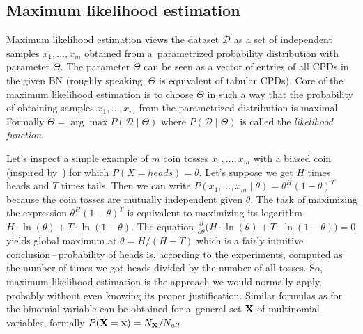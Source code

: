 \documentclass[english,cover]{fitthesis} %
\newcommand{\term}[1]{\emph{#1}}           %
\newcommand{\vars}[1]{{\bold{#1}}}         %
\begin{document}
\subsection{Maximum likelihood estimation}
Maximum likelihood estimation views the dataset $\mathcal{D}$ as a set of independent samples $x_1, \dots, x_m$ obtained from a~parametrized probability distribution with parameter $\Theta$. The parameter $\Theta$ can be seen as a vector of entries of all CPDs in the given BN (roughly speaking, $\Theta$ is  equivalent of tabular CPDs). Core of the maximum likelihood estimation is to choose $\Theta$ in such a way that the probability of obtaining samples $x_1, \dots, x_m$ from the parametrized distribution is maximal. Formally $\Theta = \arg \max P(\mathcal{D} \mid \Theta)$ where $P(\mathcal{D} \mid \Theta)$ is called the \term{likelihood function}.

Let's inspect a simple example of $m$ coin tosses $x_1, \dots, x_m$ with a biased coin (inspired by~\cite{pgm}) for which $P(X = heads) = \theta$. Let's suppose we get $H$ times heads and $T$ times tails. Then we can write $P(x_1,\dots,x_m \mid \theta) = \theta^H (1 - \theta)^T$ because the coin tosses are mutually independent given $\theta$. The task of maximizing the expression $\theta^H (1 - \theta)^T$ is equivalent to maximizing its logarithm $H \cdot \ln(\theta) + T \cdot \ln(1 - \theta)$. The equation $\frac{\partial}{\partial\theta} \bigl( H \cdot \ln(\theta) + T \cdot \ln(1 - \theta) \bigr) = 0$ yields global maximum at $\theta = H / (H + T)$ which is a fairly intuitive conclusion\,--\,probability of heads is, according to the experiments, computed as the number of times we got heads divided by the number of all tosses. So, maximum likelihood estimation is the approach we would normally apply, probably without even knowing its proper justification. Similar formulas as for the binomial variable can be obtained for a~general set $\vars{X}$ of multinomial variables, formally $P(\vars{X}=\vars{x}) = N_\vars{X} / N_{all}$.
\end{document}

